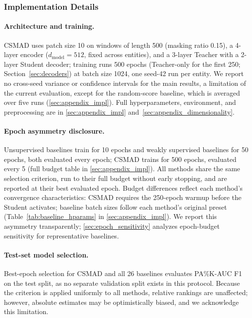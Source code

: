 \subsubsection{Implementation Details}
\label{sec:impl}

\paragraph{Architecture and training.}
CSMAD uses patch size 10 on windows of length 500 (masking ratio 0.15), a 4-layer encoder
($d_{\mathrm{model}}=512$, fixed across entities), and a 3-layer Teacher with a 2-layer Student
decoder; training runs 500 epochs (Teacher-only for the first 250; Section~\ref{sec:decoders})
at batch size 1024, one seed-42 run per entity.
We report no cross-seed variance or confidence intervals for the main results, a limitation of
the current evaluation, except for the random-score baseline, which is averaged over five runs
(\ref{sec:appendix_impl}).
Full hyperparameters, environment, and preprocessing are in
\ref{sec:appendix_impl} and~\ref{sec:appendix_dimensionality}.

\paragraph{Epoch asymmetry disclosure.}
Unsupervised baselines train for 10 epochs and weakly supervised baselines for 50 epochs, both
evaluated every epoch; CSMAD trains for 500 epochs, evaluated every 5 (full budget table in
\ref{sec:appendix_impl}).
All methods share the same selection criterion, run to their full budget without early stopping,
and are reported at their best evaluated epoch.
Budget differences reflect each method's convergence characteristics: CSMAD requires the
250-epoch warmup before the Student activates; baseline batch sizes follow each method's original
preset (Table~\ref{tab:baseline_hparams} in \ref{sec:appendix_impl}).
We report this asymmetry transparently; \ref{sec:epoch_sensitivity} analyzes
epoch-budget sensitivity for representative baselines.

\paragraph{Test-set model selection.}
Best-epoch selection for CSMAD and all 26 baselines evaluates PA\%K-AUC F1 on the test split,
as no separate validation split exists in this protocol.
Because the criterion is applied uniformly to all methods, relative rankings are unaffected;
however, absolute estimates may be optimistically biased, and we acknowledge this limitation.

